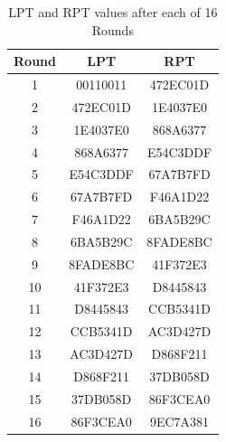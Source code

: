\documentclass[12pt, letterpaper]{article}
\begin{document}
\begin{table}[ht]
  \centering
  
  \label{tab:sample-table}
    \begin{tabular}{|c|c|c|}
    
      \hline
    Round & LPT & RPT  \\
    \hline
    1 & 00110011 & 472EC01D  \\
        \hline
    2 & 472EC01D & 1E4037E0

  \\
         \hline
    3 & 1E4037E0 & 868A6377  \\
         \hline
    4 & 868A6377 & E54C3DDF   \\
         \hline
    5 & E54C3DDF & 67A7B7FD  \\
        \hline
    6 & 67A7B7FD & F46A1D22   \\
         \hline
    7 &  F46A1D22 & 6BA5B29C

  \\
         \hline
    8 & 6BA5B29C & 8FADE8BC

 

  \\
         \hline
    9 & 8FADE8BC

 & 41F372E3

  \\
         \hline
    10 & 41F372E3

 & D8445843

  \\
         \hline
    11 & D8445843

 & CCB5341D

  \\
         \hline
    12 & CCB5341D

 & AC3D427D

  \\
         \hline
    13 & AC3D427D

 & D868F211 \\
         \hline
    14 & D868F211 & 37DB058D

  \\
         \hline
    15 & 37DB058D

 & 86F3CEA0

  \\
         \hline
    16 & 86F3CEA0

 & 9EC7A381

  \\
    \hline
  \end{tabular}
    \caption{LPT and RPT values after each of 16 Rounds}

    

\end{table}
\end{document}
